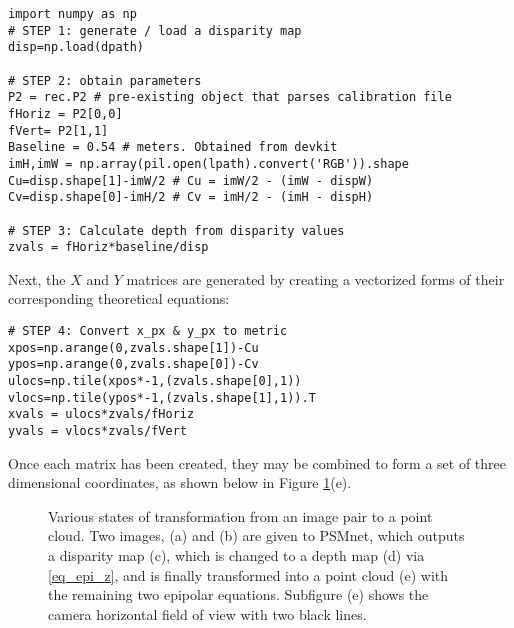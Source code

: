 \begin{lstlisting}
import numpy as np
# STEP 1: generate / load a disparity map
disp=np.load(dpath)

# STEP 2: obtain parameters
P2 = rec.P2 # pre-existing object that parses calibration file
fHoriz = P2[0,0]
fVert= P2[1,1]
Baseline = 0.54 # meters. Obtained from devkit
imH,imW = np.array(pil.open(lpath).convert('RGB')).shape
Cu=disp.shape[1]-imW/2 # Cu = imW/2 - (imW - dispW)
Cv=disp.shape[0]-imH/2 # Cv = imH/2 - (imH - dispH)

# STEP 3: Calculate depth from disparity values
zvals = fHoriz*baseline/disp
\end{lstlisting}

Next, the $X$ and $Y$ matrices are generated by creating a vectorized forms of their corresponding theoretical equations: 
\begin{lstlisting}
# STEP 4: Convert x_px & y_px to metric
xpos=np.arange(0,zvals.shape[1])-Cu
ypos=np.arange(0,zvals.shape[0])-Cv
ulocs=np.tile(xpos*-1,(zvals.shape[0],1))
vlocs=np.tile(ypos*-1,(zvals.shape[1],1)).T
xvals = ulocs*zvals/fHoriz
yvals = vlocs*zvals/fVert
\end{lstlisting}

Once each matrix has been created, they may be combined to form a set of three dimensional coordinates, as shown below in Figure \ref{reconstruction}(e). 

\begin{figure}[H]
    \centering
    \caption{Various states of transformation from an image pair to a point cloud. Two images, (a) and (b) are given to PSMnet, which outputs a disparity map (c), which is changed to a depth map (d) via \ref{eq_epi_z}, and is finally transformed into a point cloud (e) with the remaining two epipolar equations. Subfigure (e) shows the camera horizontal field of view with two black lines.}
    \label{reconstruction}
\end{figure}






